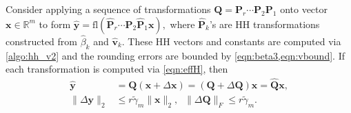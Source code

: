 \documentclass[review,onefignum,onetabnum]{siamart190516}
\newcommand{\R}{\mathbb{R}}
\newcommand{\bb}[1]{\mathbf{#1}}
\newcommand{\fl}{\mathrm{fl}}
\begin{document}
\begin{lemma}\label{lem:19.3}
	Consider applying a sequence of transformations $\bb{Q}=\bb{P}_{r}\cdots\bb{P}_{2}\bb{P}_1$ onto vector $\bb{x}\in\R^m$ to form $\hat{\bb{y}} =\fl(\hat{\bb{P}}_{r}\cdots\hat{\bb{P}}_{2}\hat{\bb{P}}_{1}\bb{x}),$
	where $\hat{\bb{P}}_{k}$'s are HH transformations constructed from $\hat{\beta}_k$ and $\hat{\bb{v}}_{k}$.
	These HH vectors and constants are computed via \cref{algo:hh_v2} and the rounding errors are bounded by \cref{eqn:beta3,eqn:vbound}.
	If each transformation is computed via \cref{eqn:effH}, then
	\begin{align}
	\hat{\bb{y}} &= \bb{Q} (\bb{x} +\Delta \bb{x}) = (\bb{Q} + \Delta \bb{Q})\bb{x} = \hat{\bb{Q}}\bb{x},\\
	\|\Delta \bb{y}\|_2 &\leq r\tilde{\gamma}_m\|\bb{x}\|_2,\;\; \|\Delta \bb{Q}\|_F\leq r\tilde{\gamma}_m .\label{eqn:19.3}
	\end{align}
\end{lemma}
\end{document}
